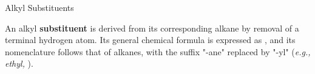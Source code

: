 \documentclass[10pt]{article}
\begin{document}
      \begin{core}{Alkyl Substituents}

        An alkyl \textbf{substituent} is derived from its corresponding alkane by removal of a terminal hydrogen atom. Its general chemical formula is expressed as , and its nomenclature follows that of alkanes, with the suffix "-ane" replaced by "-yl" (\textit{e.g., ethyl, }). 

        
      \end{core}
\end{document}
